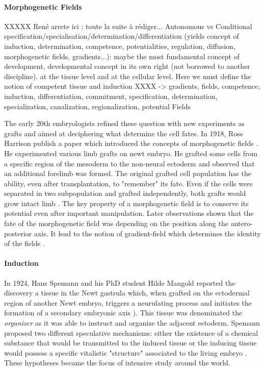 \paragraph{Morphogenetic Fields}
  XXXXX René arrete ici : toute la suite à rédiger...  Autonomous vs Conditional specification/specialisation/determination/differentiation (yields concept of induction, determination, competence, potentialities, regulation, diffusion, morphogenetic fields, gradients...): maybe the most fundamental concept of development, developmental concept in its own right (not borrowed to another discipline). at the tissue level and at the cellular level.  Here we must define the notion of competent tissue and induction XXXX -> gradients, fields, competence, induction, differentiation, commitment, specification, determination, specialization, canalization, regionalization, potential  Fields  

  The early 20th embryologists refined these question with new experiments as grafts and aimed at deciphering what determine the cell fates. In 1918, Ross Harrison publish a paper which introduced the concepts of morphogenetic fields \cite{Harrison:1918ta}. He experimented various limb grafts on newt embryo. He grafted some cells from a specific region of the mesoderm to the non-neural ectoderm and observed that an additional forelimb was formed. The original grafted cell population has the ability, even after transplantation, to "remember" its fate. Even if the cells were separated in two subpopulation and grafted independently, both grafts would grow intact limb \cite{DeRobertis:1991ua}. The key property of a morphogenetic field is to conserve its potential even after important manipulation. Later observations shown that the fate of the morphogenetic field was depending on the position along the antero-posterior axis. It lead to the notion of gradient-field which determines the identity of the fields \cite{huxley1934elements}. 

\paragraph{Induction}


  In 1924, Hans Spemann and his PhD student Hilde Mangold reported the discovery a tissue in the Newt gastrula which, when grafted on the ectodermal region of another Newt embryo, triggers a neurulating process and initiates the formation of a secondary embryonic axis \cite{Spemann:1924ky}). This tissue was denominated the \textit{organizer} as it was able to instruct and organize the adjacent ectoderm. Spemann proposed two different speculative mechanisms: either the existence of a chemical substance that would be transmitted to the induced tissue or the inducing tissue would possess a specific vitalistic "structure" associated to the living embryo \cite{Holtfreter:1991wi}. These hypotheses became the focus of intensive study around the world. 

